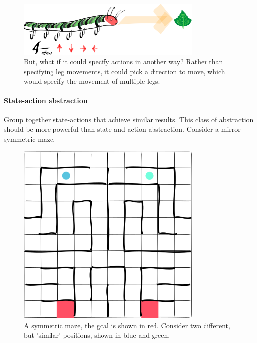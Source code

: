 \begin{figure}[h!]
\centering
\includegraphics[width=0.8\textwidth,height=0.2\textheight]{../../pictures/drawings/full-caterpillar.png}
\caption{But, what if it could specify actions in another way? Rather than specifying leg movements, it could pick a direction to move, which would specify the movement of multiple legs.}
\end{figure}

\paragraph{State-action abstraction}

Group together state-actions that achieve similar results. This class of abstraction
should be more powerful than state and action abstraction. Consider a mirror symmetric maze.

\begin{figure}[h!]
\centering
\includegraphics[width=0.8\textwidth,height=0.4\textheight]{../../pictures/drawings/maze.png}
\caption{A symmetric maze, the goal is shown in red.
Consider two different, but 'similar' positions, shown in blue and green.}
\end{figure}


